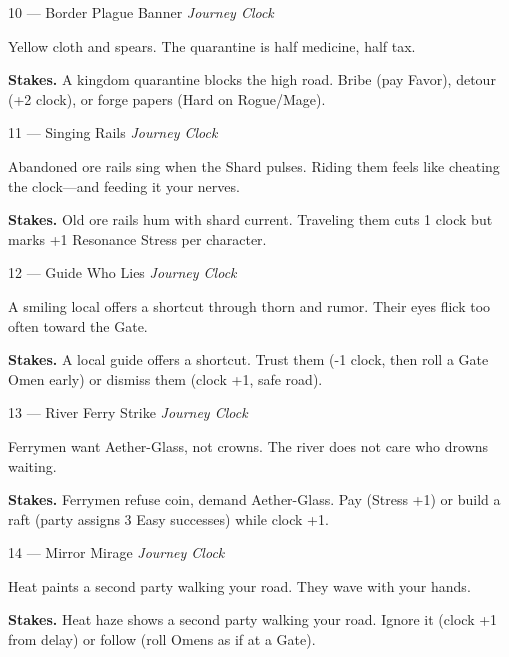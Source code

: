 \begin{encounterentry}{10 --- Border Plague Banner}
\textit{Journey Clock}

Yellow cloth and spears. The quarantine is half medicine, half tax.

\textbf{Stakes.} A kingdom quarantine blocks the high road. Bribe (pay Favor), detour (+2 clock), or forge papers (Hard on Rogue/Mage).
\end{encounterentry}

\begin{encounterentry}{11 --- Singing Rails}
\textit{Journey Clock}

Abandoned ore rails sing when the Shard pulses. Riding them feels like cheating the clock---and feeding it your nerves.

\textbf{Stakes.} Old ore rails hum with shard current. Traveling them cuts 1 clock but marks +1 Resonance Stress per character.
\end{encounterentry}

\begin{encounterentry}{12 --- Guide Who Lies}
\textit{Journey Clock}

A smiling local offers a shortcut through thorn and rumor. Their eyes flick too often toward the Gate.

\textbf{Stakes.} A local guide offers a shortcut. Trust them (-1 clock, then roll a Gate Omen early) or dismiss them (clock +1, safe road).
\end{encounterentry}

\begin{encounterentry}{13 --- River Ferry Strike}
\textit{Journey Clock}

Ferrymen want Aether-Glass, not crowns. The river does not care who drowns waiting.

\textbf{Stakes.} Ferrymen refuse coin, demand Aether-Glass. Pay (Stress +1) or build a raft (party assigns 3 Easy successes) while clock +1.
\end{encounterentry}

\begin{encounterentry}{14 --- Mirror Mirage}
\textit{Journey Clock}

Heat paints a second party walking your road. They wave with your hands.

\textbf{Stakes.} Heat haze shows a second party walking your road. Ignore it (clock +1 from delay) or follow (roll Omens as if at a Gate).
\end{encounterentry}

